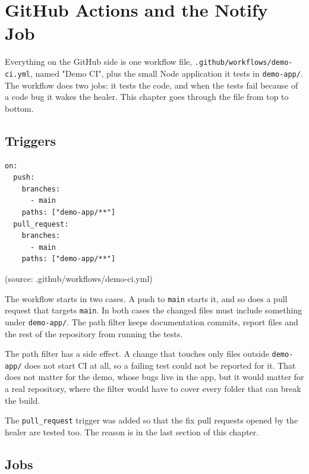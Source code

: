 
\chapter{GitHub Actions and the Notify Job}

Everything on the GitHub side is one workflow file, \texttt{.\allowbreak{}github/\allowbreak{}workflows/\allowbreak{}demo-\allowbreak{}ci.\allowbreak{}yml}, named "Demo CI", plus the small Node application it tests in \texttt{demo-\allowbreak{}app/\allowbreak{}}. The workflow does two jobs: it tests the code, and when the tests fail because of a code bug it wakes the healer. This chapter goes through the file from top to bottom.

\section{Triggers}

\begin{lstlisting}
on:
  push:
    branches:
      - main
    paths: ["demo-app/**"]
  pull_request:
    branches:
      - main
    paths: ["demo-app/**"]
\end{lstlisting}

(source: .github/\allowbreak{}workflows/\allowbreak{}demo-ci.yml)

The workflow starts in two cases. A push to \texttt{main} starts it, and so does a pull request that targets \texttt{main}. In both cases the changed files must include something under \texttt{demo-\allowbreak{}app/\allowbreak{}}. The path filter keeps documentation commits, report files and the rest of the repository from running the tests.

The path filter has a side effect. A change that touches only files outside \texttt{demo-\allowbreak{}app/\allowbreak{}} does not start CI at all, so a failing test could not be reported for it. That does not matter for the demo, whose bugs live in the app, but it would matter for a real repository, where the filter would have to cover every folder that can break the build.

The \texttt{pull\_\allowbreak{}request} trigger was added so that the fix pull requests opened by the healer are tested too. The reason is in the last section of this chapter.

\section{Jobs}

